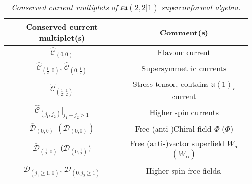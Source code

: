 \documentclass[main.tex]{subfiles}
\begin{document}
\begin{table}
\centering
\begin{tabular}{|c|c|}
\hline
Conserved current multiplet(s)&Comment(s)\\\hline
$\hat{\mathcal{C}}_{(0,0)}$&Flavour current\\\hline
$\hat{\mathcal{C}}_{(\frac{1}{2},0)}$, $\hat{\mathcal{C}}_{(0,\frac{1}{2})}$&Supersymmetric currents\\\hline
$\hat{\mathcal{C}}_{(\frac{1}{2},\frac{1}{2})}$&Stress tensor, contains $\mathfrak{u}(1)_{r}$ current\\\hline
$\hat{\mathcal{C}}_{(j_1,j_2)}|_{j_1+j_2>1}$&Higher spin currents\\\hline
$\overline{\mathcal{D}}_{(0,0)}$ $(\mathcal{D}_{(0,0)})$&Free (anti-)Chiral field $\Phi$ ($\overline{\Phi}$)\\\hline
$\overline{\mathcal{D}}_{(\frac{1}{2},0)}$ ($\mathcal{D}_{(0,\frac{1}{2})}$)&Free (anti-)vector superfield $W_{\alpha}$ $(\overline{W}_{\dot\alpha})$\\\hline
$\overline{\mathcal{D}}_{(j_1\geq1,0)}$, $\mathcal{D}_{(0,j_2\geq1)}$&Higher spin free fields.\\\hline
\end{tabular}
\caption{\textit{Conserved current multiplets of $\mathfrak{su}(2,2|1)$ superconformal algebra.}}
\label{tab:Conserved}
\end{table}
\end{document}
